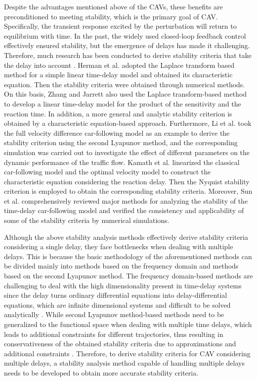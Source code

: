 \documentclass[a4paper]{cas-sc}
\begin{document}
Despite the advantages mentioned above of the CAVs, these benefits are preconditioned to meeting stability, which is the primary goal of CAV. Specifically, the transient response excited by the perturbation will return to equilibrium with time. In the past, the widely used closed-loop feedback control effectively ensured stability, but the emergence of delays has made it challenging. Therefore, much research has been conducted to derive stability criteria that take the delay into account \citep{herman1959traffic,zhang1997stability,li2010lyapunov,li2013stability,kamath2015car,sun_stability_2018}. Herman et al. \citep{herman1959traffic} adopted the Laplace transform based method for a simple linear time-delay model and obtained its characteristic equation. Then the stability criteria were obtained through numerical methods. On this basis, Zhang and Jarrett \citep{zhang1997stability} also used the Laplace transform-based method to develop a linear time-delay model for the product of the sensitivity and the reaction time. In addition, a more general and analytic stability criterion is obtained by a characteristic equation-based approach. Furthermore, Li et al. \citep{li2010lyapunov,li2013stability} took the full velocity difference car-following model as an example to derive the stability criterion using the second Lyapunov method, and the corresponding simulation was carried out to investigate the effect of different parameters on the dynamic performance of the traffic flow. Kamath et al. \citep{kamath2015car} linearized the classical car-following model and the optimal velocity model to construct the characteristic equation considering the reaction delay. Then the Nyquist stability criterion is employed to obtain the corresponding stability criteria. Moreover, Sun et al. \citep{sun_stability_2018} comprehensively reviewed major methods for analyzing the stability of the time-delay car-following model and verified the consistency and applicability of some of the stability criteria by numerical simulations.

Although the above stability analysis methods effectively derive stability criteria considering a single delay, they face bottlenecks when dealing with multiple delays. This is because the basic methodology of the aforementioned methods can be divided mainly into methods based on the frequency domain and methods based on the second Lyapunov method. The frequency domain-based methods are challenging to deal with the high dimensionality present in time-delay systems since the delay turns ordinary differential equations into delay-differential equations, which are infinite dimensional systems and difficult to be solved analytically \citep{lhachemi2020feedback}. While second Lyapunov method-based methods need to be generalized to the functional space when dealing with multiple time delays, which leads to additional constraints for different trajectories, thus resulting in conservativeness of the obtained stability criteria due to approximations and additional constraints \citep{fridman2006descriptor,wang2016fuzzy,lian2020dissipativity}. Therefore, to derive stability criteria for CAV considering multiple delays, a stability analysis method capable of handling multiple delays needs to be developed to obtain more accurate stability criteria.
\end{document}
